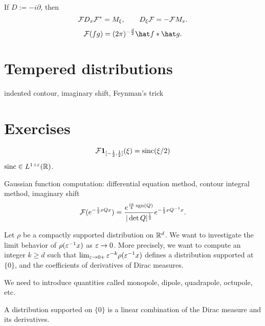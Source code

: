 \documentclass{../../large}
\begin{document}
\begin{prb}[Properties]
If $D:=-i\partial$, then
\[\mathcal{F} D_x\mathcal{F}^*=M_\xi,\qquad D_\xi\mathcal{F}=-\mathcal{F} M_x.\]
\[\cF(fg)=(2\pi)^{-\frac d2}\hat f*\hat g.\]
\end{prb}


\section{Tempered distributions}

\begin{prb}
indented contour, imaginary shift, Feynman's trick
\end{prb}







\section*{Exercises}
\begin{prb}
\[\mathcal{F}\mathbf{1}_{[-\frac12,\frac12]}(\xi)=\operatorname{sinc}(\xi/2)\]
$\operatorname{sinc}\in L^{1+\varepsilon}(\mathbb{R})$.
\end{prb}
\begin{prb}
\end{prb}
\begin{prb}
\end{prb}

\begin{prb}
Gaussian function computation:
differential equation method, contour integral method, imaginary shift
\[\mathcal{F}(e^{-\frac12xQx})=\frac{e^{\frac{i\pi}4\operatorname{sgn}(Q)}}{|\det Q|^{\frac12}}e^{-\frac12xQ^{-1}x}.\]
\end{prb}


\begin{prb}
Let $\rho$ be a compactly supported distribution on $\mathbb{R}^d$.
We want to investigate the limit behavior of $\rho(\varepsilon^{-1}x)$ as $\varepsilon\to0$.
More precisely, we want to compute an integer $k\ge d$ such that $\lim_{\varepsilon\to0+}\varepsilon^{-k}\rho(\varepsilon^{-1}x)$ defines a distribution supported at $\{0\}$, and the coefficients of derivatives of Dirac measures.

We need to introduce quantities called monopole, dipole, quadrapole, octupole, etc.
\begin{parts}
\item A distribution supported on $\{0\}$ is a linear combination of the Dirac measure and its derivatives.
\item 
\end{parts}
\end{prb}
\end{document}
